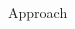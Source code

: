 \documentclass[final,t]{beamer}
\begin{document}
\begin{frame}{}
\begin{columns}[t]
\begin{column}{.4\linewidth}
\begin{block}{Approach}
%

\end{block}
\end{column}
\end{columns}
\end{frame}
\end{document}
